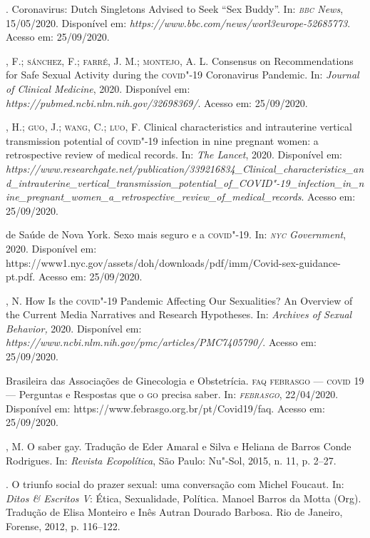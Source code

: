 \pagebreak
\begin{bibliohedra}
. Coronavirus: Dutch Singletons Advised to Seek ``Sex Buddy''. In:
\emph{\textsc{bbc} News}, 15/05/2020. Disponível em:
\emph{https://www.bbc.com/news/worl3europe-52685773}. Acesso em:
25/09/2020.

, F.; \textsc{sánchez}, F.; \textsc{farré}, J. M.; \textsc{montejo}, A. L. Consensus on
Recommendations for Safe Sexual Activity during the \textsc{covid}"-19 Coronavirus
Pandemic. In: \emph{Journal of Clinical Medicine}, 2020. Disponível em:
\emph{https://pubmed.ncbi.nlm.nih.gov/32698369/}. Acesso em: 25/09/2020.

, H.; \textsc{guo}, J.; \textsc{wang}, C.; \textsc{luo}, F. Clinical characteristics and
intrauterine vertical transmission potential of \textsc{covid}"-19 infection in
nine pregnant women: a retrospective review of medical records. In:
\emph{The Lancet}, 2020. Disponível em:
\emph{https://www.researchgate.net/publication/339216834\_Clinical\_characteristics\_and\_intrauterine\_vertical\_transmission\_potential\_of\_COVID"-19\_infection\_in\_nine\_pregnant\_women\_a\_retrospective\_review\_of\_medical\_records}.
Acesso em: 25/09/2020.

 de Saúde de Nova York. Sexo mais seguro e a \textsc{covid}"-19. In:
\emph{\textsc{nyc} Government}, 2020. Disponível em:
https://www1.nyc.gov/assets/doh/downloads/pdf/imm/Covid-sex-guidance-pt.pdf.
Acesso em: 25/09/2020.

, N. How Is the \textsc{covid}"-19 Pandemic Affecting Our Sexualities? An
Overview of the Current Media Narratives and Research Hypotheses. In:
\emph{Archives of Sexual Behavior,} 2020. Disponível em:
\emph{https://www.ncbi.nlm.nih.gov/pmc/articles/PMC7405790/}. Acesso em:
25/09/2020.

 Brasileira das Associações de Ginecologia e Obstetrícia. \textsc{faq
febrasgo --- covid} 19 --- Perguntas e Respostas que o \textsc{go} precisa saber.
In: \emph{\textsc{febrasgo}}, 22/04/2020. Disponível em:
https://www.febrasgo.org.br/pt/Covid19/faq.
Acesso em: 25/09/2020.

, M. O saber gay. Tradução de Eder Amaral e Silva e Heliana de
Barros Conde Rodrigues. In: \emph{Revista Ecopolítica}, São Paulo:
Nu"-Sol, 2015, n. 11, p. 2--27.

\titidem. O triunfo social do prazer sexual: uma conversação com Michel
Foucaut. In: \emph{Ditos \& Escritos V}: Ética, Sexualidade, Política.
Manoel Barros da Motta (Org). Tradução de Elisa Monteiro e Inês Autran
Dourado Barbosa. Rio de Janeiro, Forense, 2012, p. 116--122.


\end{bibliohedra}
